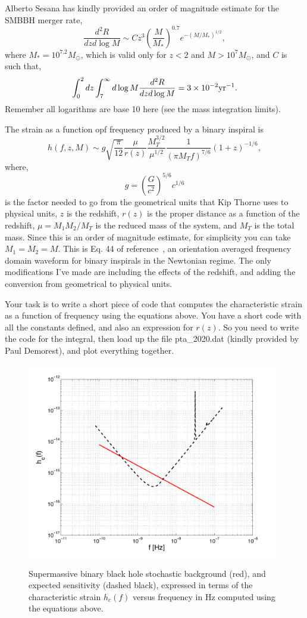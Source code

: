 \documentclass[prd,floatfix,preprintnumbers,amsmath,amssymb,nofootinbib,superscriptaddress]{revtex4}
\newcommand{\beq}{\begin{equation}}
\newcommand{\eeq}{\end{equation}}
\begin{document}
Alberto Sesana has kindly provided an order of magnitude estimate for the SMBBH merger rate,
\beq
 \frac {d^2R}{dzd\log M} \sim C z^3 \left(\frac{M}{M_*}\right)^{0.7} e^{-(M/M_*)^{1/2}},
\eeq
where $M_*=10^{7.2} M_{\odot}$, which is valid only for $z<2$ and $M>10^7 M_{\odot}$, and $C$ is such that,
\beq
 \int_0^2 dz \int_7 ^\infty d\log M  \frac {d^2R}{dzd\log M}= 3 \times 10^{-2} {\rm yr}^{-1}.
\eeq
Remember all logarithms are base 10 here (see the mass integration limits).

The strain as a function opf frequency produced by a binary inspiral is~\cite{Thorne}
\beq
h(f,z,M) \sim g \sqrt{\frac{\pi}{12}} \frac{\mu}{r(z)} \frac{M_T^{3/2}}{\mu^{1/2}}
\frac{1}{(\pi M_T f)^{7/6}}(1+z)^{-1/6}, 
\eeq
where,
\beq
g=\left(\frac{G}{c^2}\right)^{5/6} c^{1/6} 
\eeq
is the factor needed to go from the geometrical units that Kip Thorne uses to physical units, 
$z$ is the redshift, $r(z)$ is the proper distance as a function of the redshift, 
$\mu=M_1 M_2/M_T$ is the reduced mass of the system, and $M_T$ is the total mass. 
Since this is an order of magnitude estimate, for simplicity you can take 
$M_1=M_2=M$. This is Eq. 44 of reference~\cite{Thorne}, 
an orientation averaged frequency domain waveform for binary inspirals in the Newtonian 
regime.  The only modifications I've made are including the effects of the redshift, and 
adding the conversion from geometrical to physical units.

Your task is to write a short piece of code that computes the characteristic strain as a 
function of frequency using the equations above. You have a short code with all the 
constants defined, and also an expression for $r(z)$. So you need to write the code 
for the integral, then load up the file 
pta\_2020.dat (kindly provided by Paul Demorest), and plot everything together.

\begin{figure}[h]
\includegraphics[width=11cm]{SMBBH}\\
\caption{Supermassive binary black hole stochastic background (red), and expected sensitivity (dashed black), expressed in terms of the
characteristic strain $h_c(f)$ versus frequency in Hz computed using the equations above.}
\end{figure}
\end{document}

